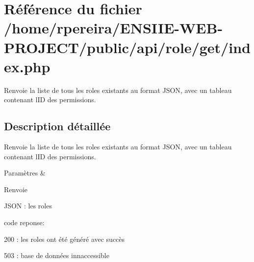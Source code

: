 \hypertarget{role_2get_2index_8php}{}\section{Référence du fichier /home/rpereira/\+E\+N\+S\+I\+I\+E-\/\+W\+E\+B-\/\+P\+R\+O\+J\+E\+C\+T/public/api/role/get/index.php}
\label{role_2get_2index_8php}


Renvoie la liste de tous les roles existants au format J\+S\+ON, avec un tableau contenant l\textquotesingle{}ID des permissions.  




\subsection{Description détaillée}
Renvoie la liste de tous les roles existants au format J\+S\+ON, avec un tableau contenant l\textquotesingle{}ID des permissions. 


\begin{DoxyParams}{Paramètres}
{\em } & \\
\hline
\end{DoxyParams}
\begin{DoxyReturn}{Renvoie}

\begin{DoxyItemize}
\item J\+S\+ON \+: les roles
\item code reponse\+:
\begin{DoxyItemize}
\item 200 \+: les roles ont été généré avec succès
\item 503 \+: base de données innaccessible 
\end{DoxyItemize}
\end{DoxyItemize}
\end{DoxyReturn}
